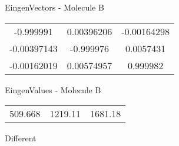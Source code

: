 \begin{multicols}{2}
\begin{center}
\vtab
 EingenVectors - Molecule B     \\
\vtab
\begin{tabular}{|c c c|}
-0.999991	 & 	0.00396206	 & 	-0.00164298	 \\
-0.00397143	 & 	-0.999976	 & 	0.0057431	 \\
-0.00162019	 & 	0.00574957	 & 	0.999982
\end{tabular}

\vtab
 EingenValues - Molecule B     \\
\vtab
\begin{tabular}{|c c c|}
509.668	 & 	1219.11	 & 	1681.18	 \\
\end{tabular}

\end{center}
\end{multicols}
\begin{center}
\vtab
\vtab
\textcolor{NavyBlue}{\Large Different}
\end{center}

 \newpage

